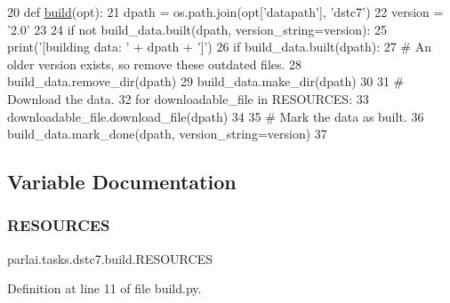 \begin{DoxyCode}
20 \textcolor{keyword}{def }\hyperlink{namespacedialog__babi__feedback_1_1build_a7a9d289f7493a5ded13c4b7f071b6184}{build}(opt):
21     dpath = os.path.join(opt[\textcolor{stringliteral}{'datapath'}], \textcolor{stringliteral}{'dstc7'})
22     version = \textcolor{stringliteral}{'2.0'}
23 
24     \textcolor{keywordflow}{if} \textcolor{keywordflow}{not} build\_data.built(dpath, version\_string=version):
25         print(\textcolor{stringliteral}{'[building data: '} + dpath + \textcolor{stringliteral}{']'})
26         \textcolor{keywordflow}{if} build\_data.built(dpath):
27             \textcolor{comment}{# An older version exists, so remove these outdated files.}
28             build\_data.remove\_dir(dpath)
29         build\_data.make\_dir(dpath)
30 
31         \textcolor{comment}{# Download the data.}
32         \textcolor{keywordflow}{for} downloadable\_file \textcolor{keywordflow}{in} RESOURCES:
33             downloadable\_file.download\_file(dpath)
34 
35         \textcolor{comment}{# Mark the data as built.}
36         build\_data.mark\_done(dpath, version\_string=version)
37 \end{DoxyCode}


\subsection{Variable Documentation}
\mbox{\label{namespaceparlai_1_1tasks_1_1dstc7_1_1build_aaab4c54d6e03048f9b7a10ad31263413}} 
\subsubsection{\texorpdfstring{R\+E\+S\+O\+U\+R\+C\+ES}{RESOURCES}}
{\footnotesize\ttfamily parlai.\+tasks.\+dstc7.\+build.\+R\+E\+S\+O\+U\+R\+C\+ES}



Definition at line 11 of file build.\+py.

